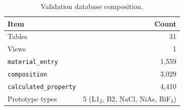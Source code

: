 \documentclass{npj-compt.mater}
\begin{document}
\begin{table}[t]
\centering
\caption{Validation database composition.}
\label{tab:db_stats}
\small
\begin{tabular}{@{}lr@{}}
\toprule
Item & Count \\
\midrule
Tables & 31 \\
Views & 1 \\
\texttt{material\_entry} & 1{,}559 \\
\texttt{composition} & 3{,}029 \\
\texttt{calculated\_property} & 4{,}410 \\
Prototype types & 5 (L1$_2$, B2, NaCl, NiAs, BiF$_3$) \\
\bottomrule
\end{tabular}
\end{table}
\end{document}
